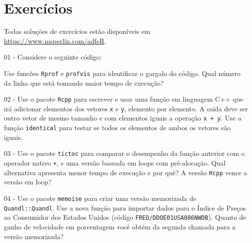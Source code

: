 \documentclass[
  11pt,
]{book}
\newenvironment{Shaded}{\begin{snugshade}}{\end{snugshade}}
\newcommand{\NormalTok}[1]{#1}
\begin{document}
\hypertarget{exercuxedcios-1}{%
\section{Exercícios}\label{exercuxedcios-1}}

Todas soluções de exercícios estão disponíveis em \url{https://www.msperlin.com/adfeR}.

01 -
Considere o seguinte código:

\begin{Shaded}
\end{Shaded}

Use funcões \texttt{Rprof} e \texttt{profvis} para identificar o gargalo do código. Qual número da linha que está tomando maior tempo de execução?

02 -
Use o pacote \texttt{Rcpp} para escrever e usar uma função em linguagem C++ que irá adicionar elementos dos vetores \texttt{x} e \texttt{y}, elemento por elemento. A saída deve ser outro vetor de mesmo tamanho e com elementos iguais a operação \texttt{x\ +\ y}. Use a função \texttt{identical} para testar se todos os elementos de ambos os vetores são iguais.

03 -
Use o pacote \texttt{tictoc} para comparar o desempenho da função anterior com o operador nativo \texttt{+}, e uma versão baseada em loops com pré-alocação. Qual alternativa apresenta menor tempo de execução e por quê? A versão \texttt{Rcpp} vence a versão em loop?

04 -
Use o pacote \texttt{memoise} para criar uma versão memorizada de \texttt{Quandl::Quandl}. Use a nova função para importar dados para o Índice de Preços ao Consumidor dos Estados Unidos (código \texttt{\textquotesingle{}FRED/DDOE01USA086NWDB\textquotesingle{}}). Quanto de ganho de velocidade em porcentagem você obtém da segunda chamada para a versão memorizada?

  

\printindex
\end{document}
